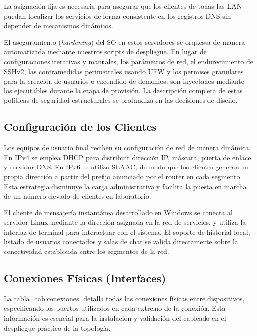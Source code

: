 La asignación fija es necesaria para asegurar que los clientes de todas las LAN puedan localizar los servicios de forma consistente en los registros DNS sin depender de mecanismos dinámicos.

El aseguramiento (\textit{hardening}) del SO en estos servidores se orquesta de manera automatizada mediante nuestros scripts de despliegue. En lugar de configuraciones iterativas y manuales, los parámetros de red, el endurecimiento de SSHv2, las contramedidas perimetrales usando UFW y los permisos granulares para la creación de usuarios o encendido de demonios, son inyectados mediante los ejecutables durante la etapa de provisión. La descripción completa de estas políticas de seguridad estructurales se profundiza en las decisiones de diseño.

\subsection{Configuración de los Clientes}

Los equipos de usuario final reciben su configuración de red de manera dinámica.
En IPv4 se emplea DHCP para distribuir dirección IP, máscara, puerta de enlace
y servidor DNS. En IPv6 se utiliza SLAAC, de modo que los clientes generan su
propia dirección a partir del prefijo anunciado por el router en cada segmento.
Esta estrategia disminuye la carga administrativa y facilita la puesta en marcha
de un número elevado de clientes en laboratorio.

El cliente de mensajería instantánea desarrollado en Windows se conecta al
servidor Linux mediante la dirección asignada en la red de servicios, y utiliza
la interfaz de terminal para interactuar con el sistema. El soporte de historial
local, listado de usuarios conectados y salas de chat se valida directamente
sobre la conectividad establecida entre los segmentos de la red.

\subsection{Conexiones Físicas (Interfaces)}

La tabla~\ref{tab:conexiones} detalla todas las conexiones físicas entre dispositivos, especificando los puertos utilizados en cada extremo de la conexión. Esta información es esencial para la instalación y validación del cableado en el despliegue práctico de la topología.

